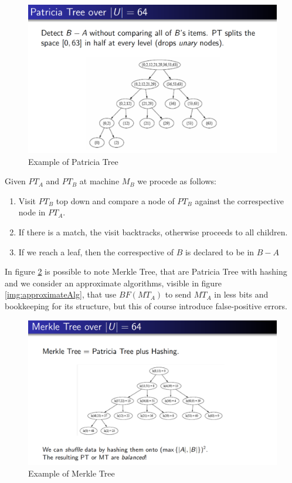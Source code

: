 \begin{figure}
	\includegraphics[width=\textwidth]{Images/patricia}
	\caption {Example of Patricia Tree}
	\label{img:patricia}
\end{figure}
Given $PT_A$ and $PT_B$ at machine $M_B$ we procede as follows:
\begin{enumerate}
    \item Visit $PT_B$ top down and compare a node of $PT_B$ against the correspective node in $PT_A$.
    \item If there is a match, the visit backtracks, otherwise proceeds to all children.
    \item If we reach a leaf, then the correspective of $B$ is declared to be in $B - A$
\end{enumerate}
In figure \ref{img:merkleTree} is possible to note Merkle Tree, that are Patricia Tree with hashing and we consider an approximate algorithms, visible in figure \ref{img:approximateAlg},
that use $BF(MT_A)$ to send $MT_A$ in less bits and bookkeeping for its structure, but this of course introduce false-positive errors.
\begin{figure}
	\includegraphics[width=\textwidth]{Images/merkle}
	\caption{Example of Merkle Tree}
	\label{img:merkleTree}
\end{figure}


